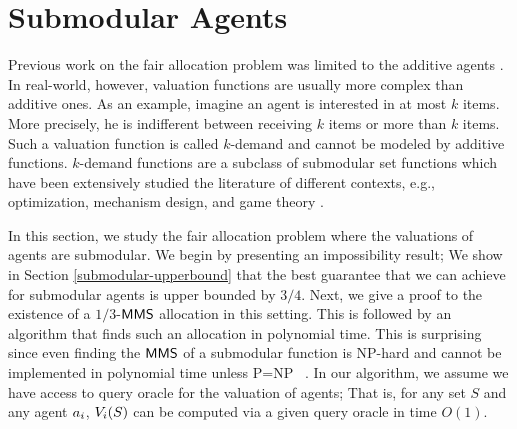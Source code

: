 \section{Submodular Agents}\label{submodular}
Previous work on the fair allocation problem was limited to the additive agents \cite{amanatidis2015approximation,Procaccia:first}. In real-world, however, valuation functions are usually more complex than additive ones. As an example, imagine an agent is interested in at most $k$ items. More precisely, he is indifferent between receiving $k$ items or more than $k$ items. Such a valuation function is called $k$-demand and cannot be modeled by additive functions. $k$-demand functions are a subclass of submodular set functions which have been extensively studied the literature of different contexts, e.g., optimization, mechanism design, and game theory \cite{buchbinder2012tight,buchbinder2015tight, fujishige2005submodular,gupta2010constrained,kim2011distributed,krause2010sfo,lee2009non,minoux1978accelerated,vondrak2008optimal}. 

 In this section, we study the fair  allocation problem where the valuations of agents are submodular. We begin by presenting an impossibility result; We show in Section \ref{submodular-upperbound} that the best guarantee that we can achieve for submodular agents is upper bounded by $3/4$. Next, we give a proof to the existence of a $1/3$-$\mathsf{MMS}$ allocation in this setting. This is followed by an algorithm that finds such an allocation in polynomial time. This is surprising since even finding the $\mathsf{MMS}$ of a submodular function is NP-hard and cannot be implemented in polynomial time unless P=NP ~\cite{epstein2014efficient}. In our algorithm, we assume we have access to query oracle for the valuation of agents; That is, for any set $S$ and any agent $a_i$, $V_i(S)$ can be computed via a given query oracle in time $O(1)$. 
 
